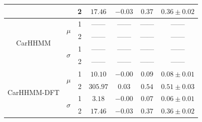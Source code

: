 \documentclass[12pt]{TD-CJS}
\begin{document}
\begin{table}
{\begin{tabular}{ccccccc}
                           &                               & 2                             & $17.46$                         & $-0.03$                     & $0.37$                             & $0.36 \pm 0.02$                             \\ \hline
\multirow{4}{*}{CarHHMM}   & \multirow{2}{*}{$\mu$}        & 1                             & ------                         & ------                     & ------                             & ------                                      \\
                           &                               & 2                             & ------                         & ------                     & ------                             & ------                                      \\
                           & \multirow{2}{*}{$\sigma$}     & 1                             & ------                         & ------                     & ------                             & ------                                      \\
                           &                               & 2                             & ------                         & ------                     & ------                             & ------                                      \\ \hline
\multirow{4}{*}{CarHHMM-DFT}& \multirow{2}{*}{$\mu$}        & 1                             & $10.10$                         & $-0.00$                     & $0.09$                             & $0.08 \pm 0.01$                             \\
                           &                               & 2                             & $305.97$                         & $0.03$                     & $0.54$                             & $0.51 \pm 0.03$                             \\
                           & \multirow{2}{*}{$\sigma$}     & 1                             & $3.18$                         & $-0.00$                     & $0.07$                             & $0.06 \pm 0.01$                             \\
                           &                               & 2                             & $17.46$                         & $-0.03$                     & $0.37$                             & $0.36 \pm 0.02$                             
\end{tabular}
}
\label{table:FoVeDBA}
\end{table}
\end{document}

